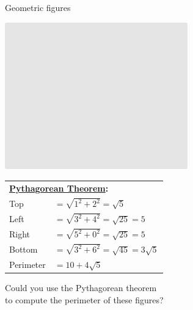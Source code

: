 \documentclass[14pt]{beamer}
\begin{document}
    \begin{frame}{Geometric figures}
        \begin{center}
            \begin{minipage}{0.5\textwidth}%
                \centering \includegraphics[scale=0.70]{figures/figure022b.pdf}
            \end{minipage}\hfill\begin{minipage}{0.49\textwidth} \footnotesize

                \hspace{-0.5em}\begin{tabular}{ll}
                    \multicolumn{2}{l}{\small \textbf{\href{https://en.wikipedia.org/wiki/Pythagorean_theorem}{Pythagorean Theorem}:}}           \\[4ex]
                    Top       & $\!\!\!\!\!= \sqrt{1^2 + 2^2} = \sqrt{5}$              \\[1.5ex]
                    Left      & $\!\!\!\!\!= \sqrt{3^2 + 4^2} = \sqrt{25} = 5$         \\[1.5ex]
                    Right     & $\!\!\!\!\!= \sqrt{5^2 + 0^2} = \sqrt{25} = 5$         \\[1.5ex]
                    Bottom    & $\!\!\!\!\!= \sqrt{3^2 + 6^2} = \sqrt{45} = 3\sqrt{5}$ \\[4ex]
                    Perimeter & $\!\!\!\!\!= 10 + 4\sqrt{5}$
                \end{tabular}
            \end{minipage}

            \bigskip \bigskip

            Could you use the Pythagorean theorem\\to compute the perimeter of these figures?
        \end{center}

    \end{frame}
\end{document}
